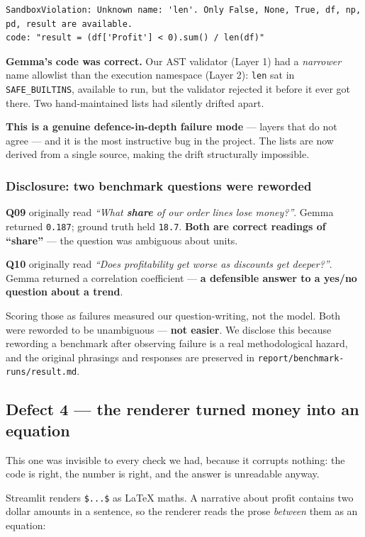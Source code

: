 \documentclass[11pt,a4paper]{article}
\begin{document}
\begin{lstlisting}
SandboxViolation: Unknown name: 'len'. Only False, None, True, df, np, pd, result are available.
code: "result = (df['Profit'] < 0).sum() / len(df)"
\end{lstlisting}

\textbf{Gemma's code was correct.} Our AST validator (Layer 1) had a \emph{narrower}
name allowlist than the execution namespace (Layer 2): \texttt{len} sat in
\texttt{SAFE\_BUILTINS}, available to run, but the validator rejected it before it ever
got there. Two hand-maintained lists had silently drifted apart.

\textbf{This is a genuine defence-in-depth failure mode} --- layers that do not agree
--- and it is the most instructive bug in the project. The lists are now derived from a
single source, making the drift structurally impossible.

\subsubsection*{Disclosure: two benchmark questions were reworded}

\textbf{Q09} originally read \emph{``What \textbf{share} of our order lines lose
money?''}. Gemma returned \texttt{0.187}; ground truth held \texttt{18.7}. \textbf{Both
are correct readings of ``share''} --- the question was ambiguous about units.

\textbf{Q10} originally read \emph{``Does profitability get worse as discounts get
deeper?''}. Gemma returned a correlation coefficient --- \textbf{a defensible answer to
a yes/no question about a trend}.

Scoring those as failures measured our question-writing, not the model. Both were
reworded to be unambiguous --- \textbf{not easier}. We disclose this because rewording
a benchmark after observing failure is a real methodological hazard, and the original
phrasings and responses are preserved in \texttt{report/benchmark-runs/result.md}.

\subsection{Defect 4 --- the renderer turned money into an equation}
\label{sec:math}

This one was invisible to every check we had, because it corrupts nothing: the code
is right, the number is right, and the answer is unreadable anyway.

Streamlit renders \texttt{\$...\$} as LaTeX maths. A narrative about profit contains
two dollar amounts in a sentence, so the renderer reads the prose \emph{between}
them as an equation:
\end{document}
